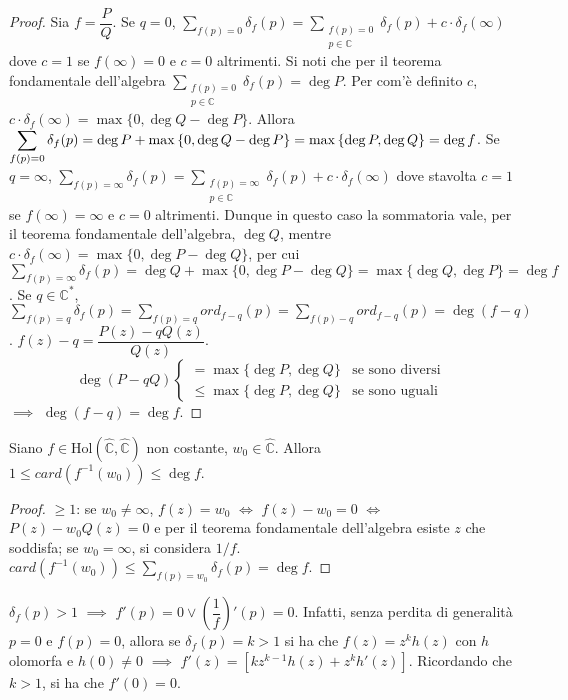 \begin{proof}
  Sia $f=\dfrac{P}{Q}$. Se $q=0$, $\displaystyle \sum_{f(p)=0} \delta_f(p)=\sum_{\substack{f(p)=0 \\ p \in \mathbb{C}}} \delta_f(p)+c \cdot \delta_f(\infty)$ dove $c=1$ se $f(\infty)=0$ e $c=0$ altrimenti.
  Si noti che per il teorema fondamentale dell'algebra $\displaystyle \sum_{\substack{f(p)=0 \\ p \in \mathbb{C}}} \delta_f(p)=\deg{P}$. Per com'è definito $c$, $c \cdot \delta_f(\infty)=\max{\{0, \deg{Q}-\deg{P}\}}$.
  Allora $\displaystyle \displaystyle \sum_{f(p)=0} \delta_f(p)=\deg{P}+\max{\{0, \deg{Q}-\deg{P}\}}=\max{\{\deg{P}, \deg{Q}\}}=\deg{f}$.
  Se $q=\infty$, $\displaystyle \sum_{f(p)=\infty} \delta_f(p)=\sum_{\substack{f(p)=\infty \\ p \in \mathbb{C}}} \delta_f(p)+c \cdot \delta_f(\infty)$ dove stavolta $c=1$ se $f(\infty)=\infty$ e $c=0$ altrimenti.
  Dunque in questo caso la sommatoria vale, per il teorema fondamentale dell'algebra, $\deg{Q}$, mentre $c \cdot \delta_f(\infty)=\max{\{0, \deg{P}-\deg{Q}\}}$,
  per cui $\displaystyle \sum_{f(p)=\infty} \delta_f(p)=\deg{Q}+\max{\{0, \deg{P}-\deg{Q}\}}=\max{\{\deg{Q}, \deg{P}\}}=\deg{f}$.
  Se $q \in \mathbb{C}^*$, $\displaystyle \sum_{f(p)=q} \delta_f(p)=\sum_{f(p)=q} ord_{f-q}(p)=\sum_{f(p)-q} ord_{f-q}(p)=\deg{(f-q)}$. $f(z)-q=\dfrac{P(z)-qQ(z)}{Q(z)}$.
  $$\deg{(P-qQ)}\begin{cases} =\max{\{\deg{P}, \deg{Q}\}} & \mbox{se sono diversi} \\ \le \max{\{\deg{P}, \deg{Q}\}} & \mbox{se sono uguali} \end{cases}$$ $\implies$ $\deg{(f-q)}=\deg{f}$.
\end{proof}

\begin{cor}
  Siano $f \in \text{Hol}(\hat{\mathbb{C}}, \hat{\mathbb{C}})$ non costante, $w_0 \in \hat{\mathbb{C}}$. Allora $1 \le card(f^{-1}(w_0)) \le \deg{f}$.
\end{cor}

\begin{proof}
  $\ge 1$: se $w_0 \not=\infty$, $f(z)=w_0$ $\iff$ $f(z)-w_0=0$ $\iff$ $P(z)-w_0Q(z)=0$ e per il teorema fondamentale dell'algebra esiste $z$ che soddisfa; se $w_0=\infty$, si considera $1/f$. \\
  $\displaystyle card(f^{-1}(w_0)) \le \sum_{f(p)=w_0} \delta_f(p)=\deg{f}$.
\end{proof}

\begin{oss}
  $\delta_f(p)>1$ $\implies$ $f'(p)=0 \lor \left(\dfrac{1}{f}\right)'(p)=0$. Infatti, senza perdita di generalità $p=0$ e $f(p)=0$, allora se $\delta_f(p)=k>1$ si ha che $f(z)=z^kh(z)$ con $h$ olomorfa e $h(0) \not=0$ $\implies$ $f'(z)=[kz^{k-1}h(z)+z^kh'(z)]$. Ricordando che $k>1$, si ha che $f'(0)=0$.
\end{oss}

